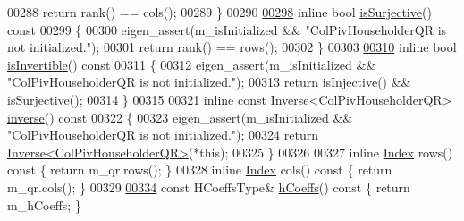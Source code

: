 \begin{DoxyCode}
00288       \textcolor{keywordflow}{return} rank() == cols();
00289     \}
00290 
\hyperlink{group___q_r___module_a87a7d06e0b0479e5b56b19c2a4f56365}{00298}     \textcolor{keyword}{inline} \textcolor{keywordtype}{bool} \hyperlink{group___q_r___module_a87a7d06e0b0479e5b56b19c2a4f56365}{isSurjective}()\textcolor{keyword}{ const}
00299 \textcolor{keyword}{    }\{
00300       eigen\_assert(m\_isInitialized && \textcolor{stringliteral}{"ColPivHouseholderQR is not initialized."});
00301       \textcolor{keywordflow}{return} rank() == rows();
00302     \}
00303 
\hyperlink{group___q_r___module_a945720f8d683f8ebe97fa807edd3142a}{00310}     \textcolor{keyword}{inline} \textcolor{keywordtype}{bool} \hyperlink{group___q_r___module_a945720f8d683f8ebe97fa807edd3142a}{isInvertible}()\textcolor{keyword}{ const}
00311 \textcolor{keyword}{    }\{
00312       eigen\_assert(m\_isInitialized && \textcolor{stringliteral}{"ColPivHouseholderQR is not initialized."});
00313       \textcolor{keywordflow}{return} isInjective() && isSurjective();
00314     \}
00315 
\hyperlink{group___q_r___module_a31c45402e74774d9cd13af0e57a6b72f}{00321}     \textcolor{keyword}{inline} \textcolor{keyword}{const} \hyperlink{class_eigen_1_1_inverse}{Inverse<ColPivHouseholderQR>} 
      \hyperlink{group___q_r___module_a31c45402e74774d9cd13af0e57a6b72f}{inverse}()\textcolor{keyword}{ const}
00322 \textcolor{keyword}{    }\{
00323       eigen\_assert(m\_isInitialized && \textcolor{stringliteral}{"ColPivHouseholderQR is not initialized."});
00324       \textcolor{keywordflow}{return} \hyperlink{class_eigen_1_1_inverse}{Inverse<ColPivHouseholderQR>}(*this);
00325     \}
00326 
00327     \textcolor{keyword}{inline} \hyperlink{namespace_eigen_a62e77e0933482dafde8fe197d9a2cfde}{Index} rows()\textcolor{keyword}{ const }\{ \textcolor{keywordflow}{return} m\_qr.rows(); \}
00328     \textcolor{keyword}{inline} \hyperlink{namespace_eigen_a62e77e0933482dafde8fe197d9a2cfde}{Index} cols()\textcolor{keyword}{ const }\{ \textcolor{keywordflow}{return} m\_qr.cols(); \}
00329 
\hyperlink{group___q_r___module_ac5943d19aa5fd96340c7df6874fcb1b9}{00334}     \textcolor{keyword}{const} HCoeffsType& \hyperlink{group___q_r___module_ac5943d19aa5fd96340c7df6874fcb1b9}{hCoeffs}()\textcolor{keyword}{ const }\{ \textcolor{keywordflow}{return} m\_hCoeffs; \}

\end{DoxyCode}
